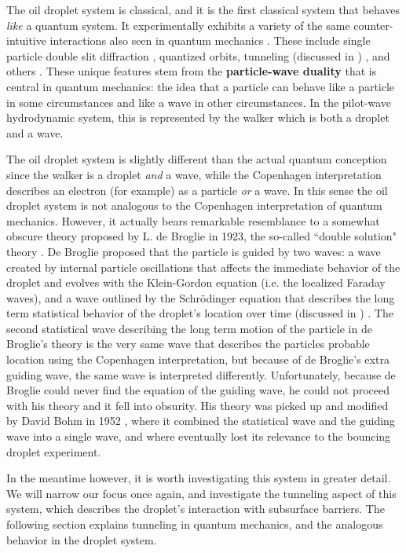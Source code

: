 The oil droplet system is classical, and it is the first classical system that behaves \textit{like} a quantum system. It experimentally exhibits a variety of the same counter-intuitive interactions also seen in quantum mechanics . These include single particle double slit diffraction , quantized orbits, tunneling (discussed in ) , and others . These unique features stem from the \textbf{particle-wave duality} that is central in quantum mechanics: the idea that a particle can behave like a particle in some circumstances and like a wave in other circumstances. In the pilot-wave hydrodynamic system, this is represented by the walker which is both a droplet and a wave.

The oil droplet system is slightly different than the actual quantum conception  since the walker is a droplet \textit{and} a wave, while the Copenhagen interpretation describes an electron (for example) as a particle \textit{or} a wave. In this sense the oil droplet system is not analogous to the Copenhagen interpretation of quantum mechanics. However, it actually bears remarkable resemblance to a somewhat obscure theory proposed by L. de Broglie in 1923, the so-called ``double solution" theory . De Broglie proposed that the particle is guided by two waves: a wave created by internal particle oscillations that affects the immediate behavior of the droplet and evolves with the Klein-Gordon equation (i.e. the localized Faraday waves), and a wave outlined by the Schr\"{o}dinger equation that describes the long term statistical behavior of the droplet's location over time (discussed in ) . The second statistical wave describing the long term motion of the particle in de Broglie's theory is the very same wave that describes the particles probable location using the Copenhagen interpretation, but because of de Broglie's extra guiding wave, the same wave is interpreted differently. Unfortunately, because de Broglie could never find the equation of the guiding wave, he could not proceed with his theory and it fell into obsurity. His theory was picked up and modified by David Bohm in 1952 , where it combined the statistical wave and the guiding wave into a single wave, and where eventually lost its relevance to the bouncing droplet experiment. 

In the meantime however, it is worth investigating this system in greater detail. We will narrow our focus once again, and investigate the tunneling aspect of this system, which describes the droplet's interaction with subsurface barriers. The following section explains tunneling in quantum mechanics, and the analogous behavior in the droplet system. 

